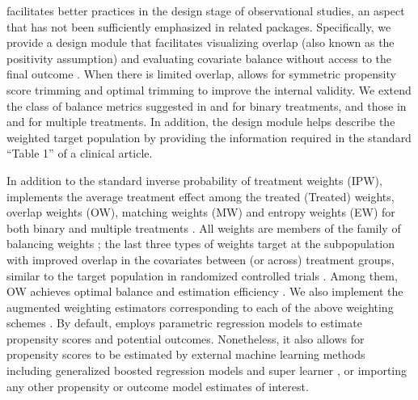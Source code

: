  facilitates better practices in the design stage of observational studies, an aspect that has not been sufficiently emphasized in related packages. Specifically, we provide a design module that facilitates visualizing overlap (also known as the positivity assumption) and evaluating covariate balance without access to the final outcome \citep{austin2015moving}. When there is limited overlap,  allows for symmetric propensity score trimming \citep{Crump2009,Yoshida2019} and optimal trimming \citep{Crump2009,Yang2016} to improve the internal validity. We extend the class of balance metrics suggested in \citet{austin2015moving} and \citet{LiThomasLi2018} for binary treatments, and those in \citet{McCaffrey2013} and \citet{li2019propensity} for multiple treatments. In addition, the design module helps describe the weighted target population by providing the information required in the standard ``Table 1'' of a clinical article.  

In addition to the standard inverse probability of treatment weights (IPW),  implements the average treatment effect among the treated (Treated) weights, overlap weights (OW), matching weights (MW) and entropy weights (EW) for both binary \citep{LiGreene13,Mao2018,LiMorganZaslavsky2018,Zhou2020} and multiple treatments \citep{Yoshida2017,li2019propensity}. All weights are members of the family of balancing weights \citep{LiMorganZaslavsky2018}; the last three types of weights target at the subpopulation with improved overlap in the covariates between (or across) treatment groups, similar to the target population in randomized controlled trials \citep{thomas2020overlap,thomas2020using}. Among them, OW achieves optimal balance and estimation efficiency \citep{LiMorganZaslavsky2018,LiThomasLi2018}. We also implement the augmented weighting estimators corresponding to each of the above weighting schemes \citep{Mao2018}. By default,  employs parametric regression models to estimate propensity scores and potential outcomes. Nonetheless, it also allows for propensity scores to be estimated by external machine learning methods including generalized boosted regression models \citep{McCaffrey2013} and super learner \citep{van2007super}, or importing any other propensity or outcome model estimates of interest.  


